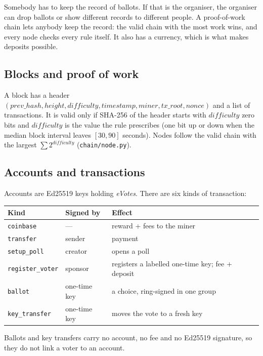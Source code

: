 \documentclass[11pt,a4paper]{article}
\newcommand{\file}[1]{\texttt{#1}}
\theoremstyle{definition}
\begin{document}
Somebody has to keep the record of ballots. If that is the organiser, the
organiser can drop ballots or show different records to different
people. A proof-of-work chain lets anybody keep the record: the valid chain
with the most work wins, and every node checks every rule itself. It also
has a currency, which is what makes deposits possible.

\subsection{Blocks and proof of work}

A block has a header $(\mathit{prev\_hash}, \mathit{height},
\mathit{difficulty}, \mathit{timestamp}, \mathit{miner}, \mathit{tx\_root},
\mathit{nonce})$ and a list of transactions. It is valid only if
SHA-256 of the header starts with $\mathit{difficulty}$ zero bits and
$\mathit{difficulty}$ is the value the rule prescribes (one bit up or down
when the median block interval leaves $[30, 90]$ seconds). Nodes follow
the valid chain with the largest $\sum 2^{\mathit{difficulty}}$
(\file{chain/node.py}).

\subsection{Accounts and transactions}

Accounts are Ed25519 keys holding \emph{eVotes}. There are six kinds of
transaction:

\begin{center}
\small
\begin{tabular}{lll}
\toprule
Kind & Signed by & Effect \\
\midrule
\texttt{coinbase}        & ---           & reward + fees to the miner \\
\texttt{transfer}        & sender        & payment \\
\texttt{setup\_poll}     & creator       & opens a poll \\
\texttt{register\_voter} & sponsor       & registers a labelled one-time key; fee + deposit \\
\texttt{ballot}          & one-time key  & a choice, ring-signed in one group \\
\texttt{key\_transfer}   & one-time key  & moves the vote to a fresh key \\
\bottomrule
\end{tabular}
\end{center}

\noindent
Ballots and key transfers carry no account, no fee and no Ed25519
signature, so they do not link a voter to an account.
\end{document}
